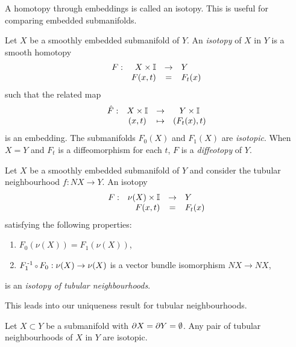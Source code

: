 A homotopy through embeddings is called an isotopy.
This is useful for comparing embedded submanifolds.

\begin{defn}[Isotopy]
	\label{def:isotopy}
	Let $X$ be a smoothly embedded submanifold of $Y$.
	An \emph{isotopy} of $X$ in $Y$ is a smooth homotopy
	\[
		\begin{array}{crcl}
			F: & X\times \mathbb{I} & \to & Y \\
			   & F(x,t) & = & F_t(x)
		\end{array}
	\]
	such that the related map
	\[
		\begin{array}{cccc}
			\hat{F}: & X\times\mathbb{I} & \to & Y\times\mathbb{I} \\
					 & (x,t) & \mapsto & (F_t(x),t)
		\end{array}
	\]
	is an embedding.
	The submanifolds $F_0(X)$ and $F_1(X)$ are \emph{isotopic}.
	When $X=Y$ and $F_t$ is a diffeomorphism for each $t$, $F$ is a \emph{diffeotopy} of $Y$.
	
	Let $X$ be a smoothly embedded submanifold of $Y$ and consider the tubular neighbourhood $f:NX\to Y$.
	An isotopy
	\[
		\begin{array}{crcl}
			F: & \nu(X)\times\mathbb{I} & \to & Y \\
			   & F(x,t) & = & F_t(x)
		\end{array}
	\]
	satisfying the following properties:
	\begin{enumerate}
		\item $F_0(\nu(X))=F_1(\nu(X))$,
		\item $F_1\inv\comp F_0:\nu(X)\to\nu(X)$ is a vector bundle isomorphism $NX\to NX$,
	\end{enumerate}
	 is an \emph{isotopy of tubular neighbourhoods}.
\end{defn}

This leads into our uniqueness result for tubular neighbourhoods.

\begin{prop}
	\label{prop:uniquenesstubularneighbourhood}
	Let $X\subset Y$ be a submanifold with $\partial X=\partial Y=\emptyset$.
	Any pair of tubular neighbourhoods of $X$ in $Y$ are isotopic.
\end{prop}	

